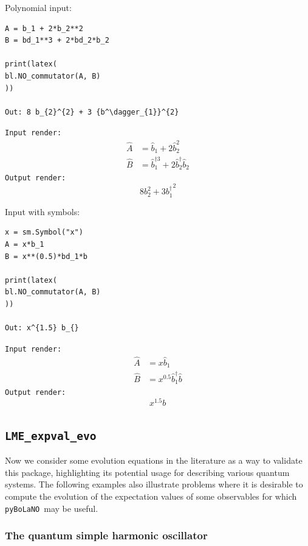 \documentclass[onecolumn, 12pt, sort&compress]{elsarticle}
\newcommand{\inlinecode}[1]{\texttt{#1}}
\newcommand{\bop}{\hat{b}}
\newcommand{\bdag}{\bop^\dagger}
\newcommand{\bdagn}[1]{\bop^{\dagger {#1}}}
\newcommand{\pybolano}{\texttt{pyBoLaNO}~}
\newenvironment{revision2}{%
\color{red}
}
{}
\begin{document}
\noindent Polynomial input:
\begin{verbatim}
A = b_1 + 2*b_2**2
B = bd_1**3 + 2*bd_2*b_2

print(latex(
bl.NO_commutator(A, B)
))

Out: 8 b_{2}^{2} + 3 {b^\dagger_{1}}^{2}
\end{verbatim}
\begin{revision2}
\inlinecode{Input render:}
\begin{align*}
    \hat{A} &= \bop_1+2\bop_2^2
    \\
    \hat{B} &= \bdagn{3}_1+2\bdag_2\bop_2
\end{align*}
\inlinecode{Output render:}
\begin{equation*}
    8 b_{2}^{2} + 3 {b^\dagger_{1}}^{2}
\end{equation*}
\end{revision2}

\newpage
\noindent Input with symbols:
\begin{verbatim}
x = sm.Symbol("x")
A = x*b_1 
B = x**(0.5)*bd_1*b

print(latex(
bl.NO_commutator(A, B)
))

Out: x^{1.5} b_{}
\end{verbatim}
\begin{revision2}
\inlinecode{Input render:}
\begin{align*}
    \hat{A} &= x\bop_1
    \\
    \hat{B} &= x^{0.5}\bdag_1\bop
\end{align*}
\inlinecode{Output render:}
\begin{equation*}
    x^{1.5} b_{}
\end{equation*}
\end{revision2}


\subsection{\inlinecode{LME_expval_evo}}

Now we consider some evolution equations in the literature as a way to validate this package, highlighting its potential usage for describing various quantum systems.  The following examples also illustrate problems where it is desirable to compute the evolution of the expectation values of some observables for which \pybolano may be useful. 

\subsubsection{The quantum simple harmonic oscillator}
\end{document}
